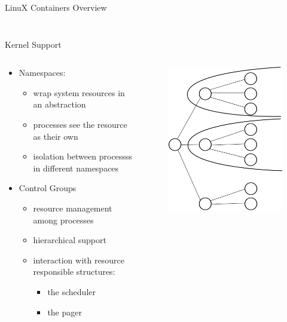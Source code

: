 \begin{frame}{LinuX Containers Overview}
\begin{columns}[T]
\begin{column}{.5\textwidth}
\begin{figure}[ht]
			\end{figure}
		\end{column}
	\end{columns}
\end{frame}

\begin{frame}{Kernel Support}
	\begin{columns}[T]
		\begin{column}{.5\textwidth}
			\begin{itemize}
			\item Namespaces:
				\begin{itemize}
				\item wrap system resources in an abstraction
				\item processes see the resource as their own
				\item isolation between processss in different namespaces
				\end{itemize}
			\item Control Groups
				\begin{itemize}
				\item resource management among processes
				\item hierarchical support
				\item interaction with resource responsible structures:
					\begin{itemize}
					\item the scheduler
					\item the pager
					\end{itemize}
				\end{itemize}
			\end{itemize}	
		\end{column}
		\begin{column}{.5\textwidth}
			\begin{figure}[ht]
				\centering
				\includegraphics[scale=0.2]{img/namespaces.png}
			\end{figure}
			

\end{column}
\end{columns}
\end{frame}
